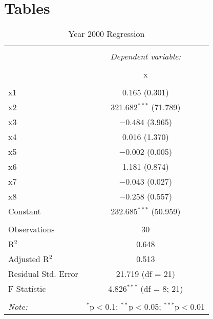 \documentclass{article}
\begin{document}
\newpage
\section{Tables}
 \begin{table}[!htbp] \centering 
  \caption{Year 2000 Regression} 
  \label{} 
\begin{tabular}{@{\extracolsep{1pt}}lc} 
\\[-1.8ex]\hline 
\hline \\[-1.8ex] 
 & \multicolumn{1}{c}{\textit{Dependent variable:}} \\ 
\cline{2-2} 
\\[-1.8ex] & x \\ 
\hline \\[-1.8ex] 
 x1 & 0.165 (0.301) \\ 
  x2 & 321.682$^{***}$ (71.789) \\ 
  x3 & $-$0.484 (3.965) \\ 
  x4 & 0.016 (1.370) \\ 
  x5 & $-$0.002 (0.005) \\ 
  x6 & 1.181 (0.874) \\ 
  x7 & $-$0.043 (0.027) \\ 
  x8 & $-$0.258 (0.557) \\ 
  Constant & 232.685$^{***}$ (50.959) \\ 
 \hline \\[-1.8ex] 
Observations & 30 \\ 
R$^{2}$ & 0.648 \\ 
Adjusted R$^{2}$ & 0.513 \\ 
Residual Std. Error & 21.719 (df = 21) \\ 
F Statistic & 4.826$^{***}$ (df = 8; 21) \\ 
\hline 
\hline \\[-1.8ex] 
\textit{Note:}  & \multicolumn{1}{r}{$^{*}$p$<$0.1; $^{**}$p$<$0.05; $^{***}$p$<$0.01} \\ 
\end{tabular} 
\end{table}
\newpage
\end{document}
